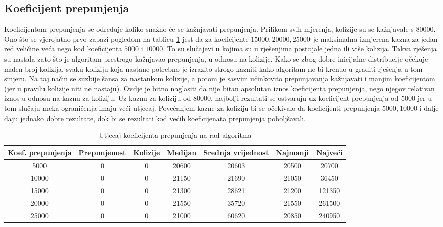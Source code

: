 \documentclass[times, utf8, zavrsni]{fer}
\begin{document}
\subsection{Koeficijent prepunjenja}
Koeficijentom prepunjenja se određuje koliko snažno će se kažnjavati prepunjenja. Prilikom svih mjerenja, kolizije su se kažnjavale s $80000$. Ono što se vjerojatno prvo
zapazi pogledom na tablicu \ref{tbl:utjecaj_prepunjenja} jest da za koeficijente $15000, 20000, 25000$ je maksimalna izmjerena kazna za jedan red veličine veća
nego kod koeficijenta $5000$ i $10000$. To su slučajevi u kojima su u rješenjima postojale jedna ili više kolizija. Takva rješenja su nastala zato što je algoritam
prestrogo kažnjavao prepunjenja, u odnosu na kolizije. Kako se zbog dobre inicijalne distribucije očekuje malen broj kolizija, svaku koliziju koja nastane potrebno
je izrazito strogo kazniti kako algoritam ne bi krenuo u graditi rješenja u tom smjeru. Na taj način se suzbije šansa za nastankom kolizije, a potom je sasvim učinkovito
prepunjavanja kažnjavati i manjim koeficijentom (jer u pravilu kolizije niti ne nastaju). Ovdje je bitno naglasiti da nije bitan apsolutan iznos koeficijenta prepunjenja,
nego njegov relativan iznos u odnosu na kaznu za koliziju. Uz kaznu za koliziju od $80000$, najbolji rezultati se ostvaruju uz koeficijent prepunjenja od $5000$ jer u tom slučaju
meka ograničenja imaju veći utjecaj. Povećanjem kazne za koliziju bi se očekivalo da koeficijenti prepunjenja $5000, 10000$ i dalje daju jednako dobre rezultate, dok bi
se rezultati kod većih koeficijenata prepunjenja poboljšavali.


\begin{table}
  \caption{Utjecaj koeficijenta prepunjenja na rad algoritma}
  \label{tbl:utjecaj_prepunjenja}
  \centering
  \begin{tabular}{c | c | c | c | c | c | c  }
    Koef. prepunjenja &  Prepunjenost & Kolizije & Medijan & Srednja vrijednost & Najmanji & Najveći \\ \hline
    5000  & 0 & 0 & 20600 & 20603 & 20500 & 20700 \\ \hline
    10000 & 0 & 0 & 21150 & 21690 & 21050 & 36450 \\ \hline
    15000 & 0 & 0 & 21300 & 28621 & 21200 & 121350 \\ \hline
    20000 & 0 & 0 & 21550 & 35720 & 21550 & 261500 \\ \hline
    25000 & 0 & 0 & 21000 & 60620 & 20850 & 240950 \\ \hline
  \end{tabular}
\end{table}
\end{document}
